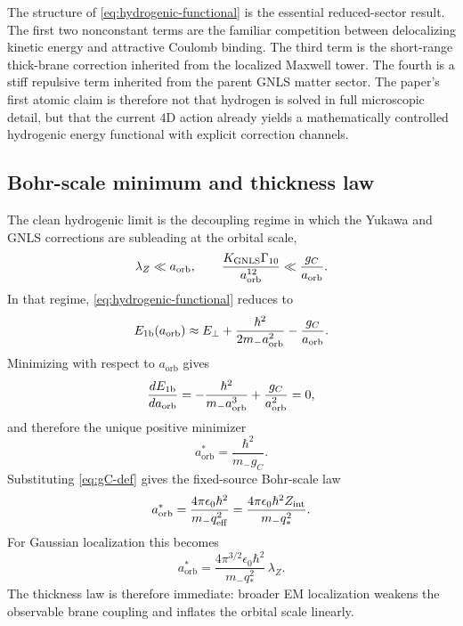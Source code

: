 \documentclass[11pt]{article}
\theoremstyle{plain}
\theoremstyle{definition}
\theoremstyle{remark}
\newcommand{\aorb}{a_{\mathrm{orb}}}
\newcommand{\qeff}{q_{\mathrm{eff}}}
\newcommand{\qstar}{q_*}
\begin{document}
The structure of \cref{eq:hydrogenic-functional} is the essential reduced-sector result. The first two nonconstant terms are the familiar competition between delocalizing kinetic energy and attractive Coulomb binding. The third term is the short-range thick-brane correction inherited from the localized Maxwell tower. The fourth is a stiff repulsive term inherited from the parent GNLS matter sector. The paper's first atomic claim is therefore not that hydrogen is solved in full microscopic detail, but that the current 4D action already yields a mathematically controlled hydrogenic energy functional with explicit correction channels.

\subsection{Bohr-scale minimum and thickness law}\label{subsec:bohr-scale-minimum}

The clean hydrogenic limit is the decoupling regime in which the Yukawa and GNLS corrections are subleading at the orbital scale,
\begin{equation}
\lambda_Z\ll \aorb,
\qquad
\frac{K_{\rm GNLS}\Gamma_{10}}{\aorb^{12}}\ll \frac{g_C}{\aorb}.
\label{eq:clean-hydrogenic-limit}
\end{equation}
In that regime, \cref{eq:hydrogenic-functional} reduces to
\begin{equation}
E_{1\rm b}(\aorb)
\approx
E_\perp+\frac{\hbar^2}{2m_-\aorb^2}-\frac{g_C}{\aorb}.
\label{eq:hydrogenic-clean-functional}
\end{equation}
Minimizing with respect to $\aorb$ gives
\begin{equation}
\frac{dE_{1\rm b}}{d\aorb}
=-\frac{\hbar^2}{m_-\aorb^3}+\frac{g_C}{\aorb^2}=0,
\end{equation}
and therefore the unique positive minimizer
\begin{equation}
\aorb^* = \frac{\hbar^2}{m_- g_C}.
\label{eq:bohr-min}
\end{equation}
Substituting \cref{eq:gC-def} gives the fixed-source Bohr-scale law
\begin{equation}
\aorb^*
=
\frac{4\pi\epsilon_0\hbar^2}{m_-\qeff^2}
=
\frac{4\pi\epsilon_0\hbar^2 Z_{\rm int}}{m_-\qstar^2}.
\label{eq:bohr-min-thickness-law}
\end{equation}
For Gaussian localization this becomes
\begin{equation}
\aorb^* = \frac{4\pi^{3/2}\epsilon_0\hbar^2}{m_-\qstar^2}\,\lambda_Z.
\label{eq:bohr-min-gaussian}
\end{equation}
The thickness law is therefore immediate: broader EM localization weakens the observable brane coupling and inflates the orbital scale linearly.
\end{document}

